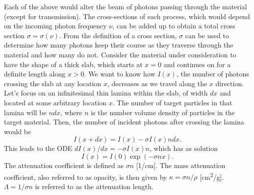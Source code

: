 \documentclass[a4paper,11pt]{report}
\begin{document}
Each of the above would alter the beam of photons passing through the material (except for transmission). The cross-sections of each process, which would depend on the incoming photon frequency $\nu$, can be added up to obtain a total cross section $\sigma = \sigma(\nu)$. From the definition of a cross section, $\sigma$ can be used to determine how many photons keep their course as they traverse through the material and how many do not. Consider the material under consideration to have the shape of a thick slab, which starts at $x=0$ and continues on for a definite length along $x>0$. We want to know how $I(x)$, the number of photons crossing the slab at any location $x$, decreases as we travel along the $x$ direction. Let's focus on an infinitesimal thin lamina within the slab, of width $dx$ and located at some arbitrary location $x$. The number of target particles in that lamina will be $n dx$, where $n$ is the number volume density of particles in the target material. Then, the number of incident photons after crossing the lamina would be
\begin{equation}
    I(x+dx) = I(x) -\sigma I(x) n dx.
\end{equation}
This leads to the ODE $dI(x)/dx = -\sigma I(x) n$, which has as solution
\begin{equation}
    I(x) = I(0) \exp(-\sigma n x).
\end{equation}
The attenuation coefficient is defined as $\sigma n$ [1/cm]. The mass attenuation coefficient, also referred to as opacity, is then given by $\kappa = \sigma n / \rho$ [cm\textsuperscript{2}/g]. $\Lambda = 1 / \sigma n$ is referred to as the attenuation length. 
\end{document}

